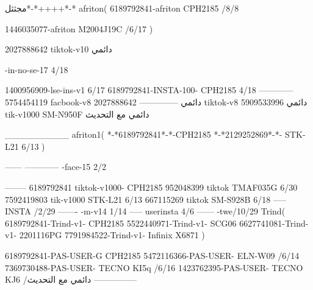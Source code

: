 مجثثل*-*++++*-*
afriton(
6189792841-afriton CPH2185  /8/8

1446035077-afriton M2004J19C  /6/17
)

2027888642 tiktok-v10
دائمي

-in-no-se-17 4/18

1400956909-lse-ins-v1 6/17
6189792841-INSTA-100- CPH2185 4/18
------------
5754454119 facbook-v8
دائمي
--------------
2027888642 tiktok-v8
دائمي
5909533996 tik-v1000  SM-N950F
دائمي مع التحديث

__________
afriton1(
*-*6189792841*-*-CPH2185
*-*2129252869*-*- STK-L21  6/13
)


------
------------
-face-15 2/2

--------
6189792841 tiktok-v1000- CPH2185 
952048399 tiktok TMAF035G  6/30
7592419803 tik-v1000 STK-L21  6/13
667115269 tiktok SM-S928B  6/18
-----
 INSTA /2/29
-------
-m-v14 1/14
-----
userinsta 4/6
------
-twe/10/29
Trind(
6189792841-Trind-v1- CPH2185 
5522440971-Trind-v1- SCG06 \6
6627741081-Trind-v1- 2201116PG \6
7791984522-Trind-v1- Infinix X6871 \6
)


6189792841-PAS-USER-G CPH2185 
5472116366-PAS-USER- ELN-W09  /6/14
7369730488-PAS-USER- TECNO KI5q  /6/16
1423762395-PAS-USER- TECNO KJ6  /دائمي مع التحديث
    ---------------
